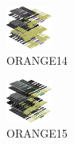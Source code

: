 \hspace{0.1cm}
\begin{minipage}[b]{0.15\linewidth}
\begin{figure}[H]                                                          
  \centering                                                             
  \begin{adjustbox}{width=1.5cm,center}                                   
  \includegraphics[width=1.5cm]{src/colorspace_colourflow/flows/colourflow_254-45.png}%
  \end{adjustbox}                                                        
\caption*{ORANGE14}                                           
\end{figure}                                                               
\end{minipage}
\hspace{0.1cm}
\begin{minipage}[b]{0.15\linewidth}
\begin{figure}[H]                                                          
  \centering                                                             
  \begin{adjustbox}{width=1.5cm,center}                                   
  \includegraphics[width=1.5cm]{src/colorspace_colourflow/flows/colourflow_255-45.png}%
  \end{adjustbox}                                                        
\caption*{ORANGE15}                                           
\end{figure}                                                               
\end{minipage}
\hspace{0.1cm}

